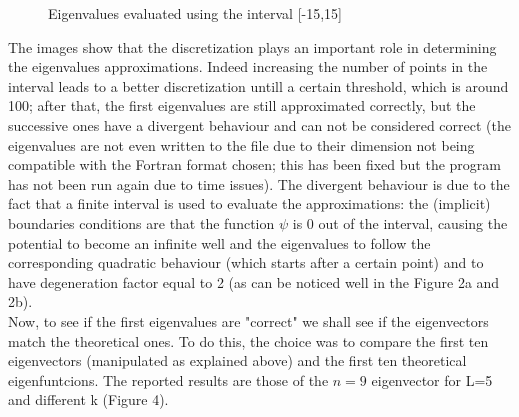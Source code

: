 \documentclass[12pt, a4paper, notitlepage]{report}
\begin{document}
\begin{figure}[h!]
	\label{L15k10000}
	\caption{Eigenvalues evaluated using the interval [-15,15]}
\end{figure}

The images show that the discretization plays an important role in determining the eigenvalues approximations. Indeed increasing the number of points in the interval leads to a better discretization untill a certain threshold, which is around 100; after that, the first eigenvalues are still approximated correctly, but the successive ones have a divergent behaviour and can not be considered correct (the eigenvalues are not even written to the file due to their dimension not being compatible with the Fortran format chosen; this has been fixed but the program has not been run again due to time issues). The divergent behaviour is due to the fact that a finite interval is used to evaluate the approximations: the (implicit) boundaries conditions are that the function $\psi$ is 0 out of the interval, causing the potential to become an infinite well and the eigenvalues to follow the corresponding quadratic behaviour (which starts after a certain point) and to have degeneration factor equal to 2 (as can be noticed well in the Figure 2a and 2b).\\

Now, to see if the first eigenvalues are "correct" we shall see if the eigenvectors match the theoretical ones. To do this, the choice was to compare the first ten eigenvectors (manipulated as explained above) and the first ten theoretical eigenfuntcions. The reported results are those of the $n=9$ eigenvector for L=5 and different k (Figure 4).
\end{document}
